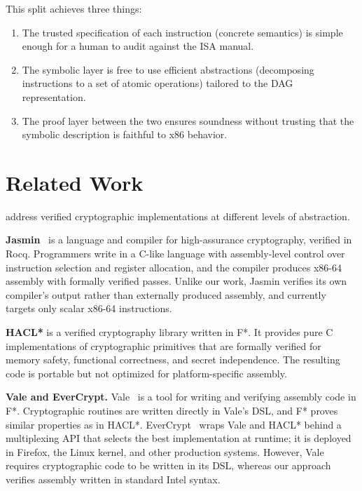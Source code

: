This split achieves three things:
\begin{enumerate}
    \item The trusted specification of each instruction (concrete semantics) is simple enough for a human to audit against the ISA manual.
    \item The symbolic layer is free to use efficient abstractions (decomposing instructions to a set of atomic operations) tailored to the DAG representation.
    \item The proof layer between the two ensures soundness without trusting that the symbolic description is faithful to x86 behavior.
\end{enumerate}

\section{Related Work}
\label{sec:related-work}

 address verified cryptographic implementations at different levels of abstraction.

\textbf{Jasmin}~\autocite{jasmin2017} is a language and compiler for high-assurance cryptography, verified in Rocq.
Programmers write in a C-like language with assembly-level control over instruction selection and register allocation, and the compiler produces x86-64 assembly with formally verified passes.
Unlike our work, Jasmin verifies its own compiler's output rather than externally produced assembly, and currently targets only scalar x86-64 instructions.

\textbf{HACL*} is a verified cryptography library written in F*. It provides pure C implementations of cryptographic primitives that are formally verified for memory safety, functional correctness, and secret independence. The resulting code is portable but not optimized for platform-specific assembly.

\textbf{Vale and EverCrypt.}
Vale~\autocite{vale2017} is a tool for writing and verifying assembly code in F*.
Cryptographic routines are written directly in Vale's DSL, and F* proves similar properties as in HACL*.
EverCrypt~\autocite{evercrypt2020} wraps Vale and HACL* behind a multiplexing API that selects the best implementation at runtime; it is deployed in Firefox, the Linux kernel, and other production systems.
However, Vale requires cryptographic code to be written in its DSL, whereas our approach verifies assembly written in standard Intel syntax.

